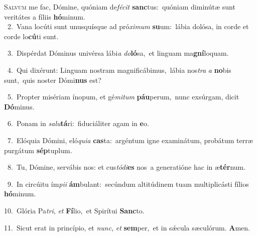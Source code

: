 \lettrine{\initial\textcolor{\initialcolor}{S}}{alvum} me fac, Dómine, quóniam de\-\textit{fé}\-\textit{cit} \textbf{sanc}\-tus:~\star quóniam diminútæ sunt veritátes a fíliis \textbf{hó}\-minum.\\
{\numbfont\textcolor{\numbcolor}{~2.}}~Vana locúti sunt unusquísque ad pró\-\textit{xi}\-\textit{mum} \textbf{su}\-um:~\star lábia dolósa, in corde et corde lo\-\textbf{cú}\-ti sunt.\par
{\numbfont\textcolor{\numbcolor}{~3.}}~Dispérdat Dóminus univérsa lábi\textit{a} \textit{do}\-\textbf{ló}sa,~\star et linguam ma\-\textbf{gní}\-loquam.\par
{\numbfont\textcolor{\numbcolor}{~4.}}~Qui dixérunt: Linguam nostram magnificábimus,~\dagger lábia nos\textit{tra} \textit{a} \textbf{no}\-bis sunt,~\star quis noster Dómi\textbf{nus} est?\par
{\numbfont\textcolor{\numbcolor}{~5.}}~Propter misériam ínopum, et gé\-\textit{mi}\-\textit{tum} \textbf{páu}\-perum,~\star nunc exsúrgam, dicit \textbf{Dó}\-minus.\par
{\numbfont\textcolor{\numbcolor}{~6.}}~Ponam in \textit{sa}\-\textit{lu}\textbf{tá}ri:~\star fiduciáliter agam in \textbf{e}\-o.\par
{\numbfont\textcolor{\numbcolor}{~7.}}~Elóquia Dómini, eló\-\textit{qui}\-\textit{a} \textbf{cas}\-ta:~\star argéntum igne examinátum, probátum terræ purgátum \textbf{sép}\-tuplum.\par
{\numbfont\textcolor{\numbcolor}{~8.}}~Tu, Dómine, servábis nos: et cus\-\textit{tó}\-\textit{di}\textbf{es} nos~\star a generatióne hac in æ\-\textbf{tér}\-num.\par
{\numbfont\textcolor{\numbcolor}{~9.}}~In circúitu ím\-\textit{pi}\-\textit{i} \textbf{ám}\-bulant:~\star secúndum altitúdinem tuam multiplicásti fílios \textbf{hó}\-minum.\par
{\numbfont\textcolor{\numbcolor}{10.}}~Glória Pa\-\textit{tri}\-, \textit{et} \textbf{Fí}\-lio,~\star et Spirítui \textbf{Sanc}\-to.\par
{\numbfont\textcolor{\numbcolor}{11.}}~Sicut erat in princípio, et \textit{nunc}\-, \textit{et} \textbf{sem}\-per,~\star et in sǽcula sæculórum. \textbf{A}\-men.\par
